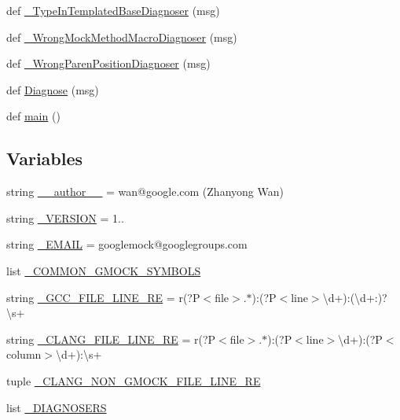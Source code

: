 \begin{DoxyCompactItemize}
\item 
def \hyperlink{namespacegmock__doctor_ac4e4908d4e43ef87f522365e99ec36c8}{\+\_\+\+Type\+In\+Templated\+Base\+Diagnoser} (msg)
\item 
def \hyperlink{namespacegmock__doctor_a430611c0e038abaa33ae320b7118779b}{\+\_\+\+Wrong\+Mock\+Method\+Macro\+Diagnoser} (msg)
\item 
def \hyperlink{namespacegmock__doctor_a89b0bfee48942a164f7a4e1e923f3a48}{\+\_\+\+Wrong\+Paren\+Position\+Diagnoser} (msg)
\item 
def \hyperlink{namespacegmock__doctor_a8b791ed6679a0135862ebb3e8c27b2b4}{Diagnose} (msg)
\item 
def \hyperlink{namespacegmock__doctor_a6eb6c47cf5a3a7c4266f473c0af6b82f}{main} ()
\end{DoxyCompactItemize}
\subsection*{Variables}
\begin{DoxyCompactItemize}
\item 
string \hyperlink{namespacegmock__doctor_a5834be312e84670506af7df4a7b6bf51}{\+\_\+\+\_\+author\+\_\+\+\_\+} = \textquotesingle{}wan@google.\+com (Zhanyong Wan)\textquotesingle{}
\item 
string \hyperlink{namespacegmock__doctor_a8f29d54c7339c9ac86409b5e78f63887}{\+\_\+\+V\+E\+R\+S\+I\+ON} = \textquotesingle{}1..\textquotesingle{}
\item 
string \hyperlink{namespacegmock__doctor_af8532f014caa9251e48f07e08d92f855}{\+\_\+\+E\+M\+A\+IL} = \textquotesingle{}googlemock@googlegroups.\+com\textquotesingle{}
\item 
list \hyperlink{namespacegmock__doctor_ac704a49399e603fba5104e490f17fce3}{\+\_\+\+C\+O\+M\+M\+O\+N\+\_\+\+G\+M\+O\+C\+K\+\_\+\+S\+Y\+M\+B\+O\+LS}
\item 
string \hyperlink{namespacegmock__doctor_abfa92b554c13bc7b3f37bd53a52288b4}{\+\_\+\+G\+C\+C\+\_\+\+F\+I\+L\+E\+\_\+\+L\+I\+N\+E\+\_\+\+RE} = r\textquotesingle{}(?P$<$file$>$.$\ast$)\+:(?P$<$line$>$\textbackslash{}d+)\+:(\textbackslash{}d+\+:)?\textbackslash{}s+\textquotesingle{}
\item 
string \hyperlink{namespacegmock__doctor_a068279bf4a0afdf3f2106351892a8c42}{\+\_\+\+C\+L\+A\+N\+G\+\_\+\+F\+I\+L\+E\+\_\+\+L\+I\+N\+E\+\_\+\+RE} = r\textquotesingle{}(?P$<$file$>$.$\ast$)\+:(?P$<$line$>$\textbackslash{}d+)\+:(?P$<$column$>$\textbackslash{}d+)\+:\textbackslash{}s+\textquotesingle{}
\item 
tuple \hyperlink{namespacegmock__doctor_a54b24983d4a31b34337e0ef6fdf4fe91}{\+\_\+\+C\+L\+A\+N\+G\+\_\+\+N\+O\+N\+\_\+\+G\+M\+O\+C\+K\+\_\+\+F\+I\+L\+E\+\_\+\+L\+I\+N\+E\+\_\+\+RE}
\item 
list \hyperlink{namespacegmock__doctor_ad8d4f979dbf1b3c8edb226d124571b4e}{\+\_\+\+D\+I\+A\+G\+N\+O\+S\+E\+RS}
\end{DoxyCompactItemize}


